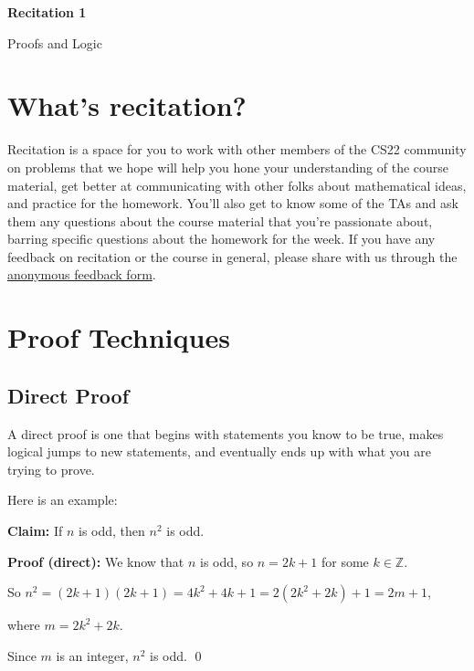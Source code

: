 \documentclass[12pt,letterpaper]{article}
\newcommand\Z{\mathbb Z}
\begin{document}
  \thispagestyle{firstpagestyle}
  \begin{center}
    {\large \textbf{Recitation 1}}
    
    {\large Proofs and Logic}
  \end{center}
  
    \section*{What's recitation?}
    
    Recitation is a space for you to work with other members of the CS22 community on problems that we hope will help you hone your understanding of the course material, get better at communicating with other folks about mathematical ideas, and practice for the homework. You'll also get to know some of the TAs and ask them any questions about the course material that you're passionate about, barring specific questions about the homework for the week. If you have any feedback on recitation or the course in general, please share with us through the \href{https://docs.google.com/forms/d/e/1FAIpqLSfq3do7_irvrtC_f-1zxwq3f-Ro17K_P6lAiRa78OSeHkYoGw/viewform}{anonymous feedback form}.
      
      \section*{Proof Techniques}

      \subsection*{Direct Proof}

      A direct proof is one that begins with statements you know to be true, makes logical jumps to new statements, and eventually ends up with what you are trying to prove.
      
      Here is an example:

      \textbf{Claim:} If $n$ is odd, then $n^2$ is odd.

      \textbf{Proof (direct):} We know that $n$ is odd, so $n = 2k + 1$ for some $k \in \Z$.

      So $n^2 = (2k+1)(2k+1) = 4k^2 + 4k + 1 = 2(2k^2 + 2k) + 1 = 2m+1$,

      where $m =  2k^2 + 2k$.

      Since $m$ is an integer, $n^2$ is odd. \qed
\end{document}
